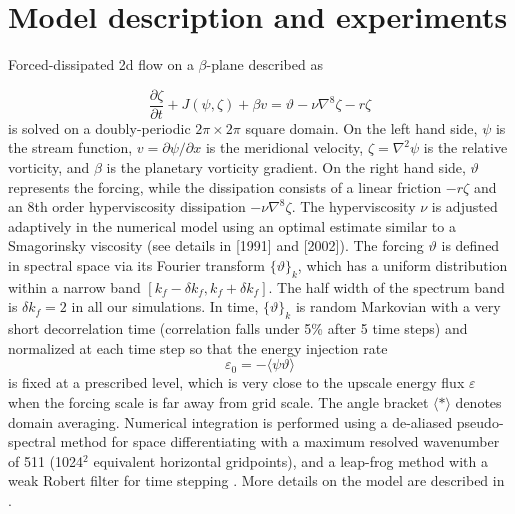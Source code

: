 \documentclass{ametsoc}
\begin{document}
\section{Model description and experiments}

Forced-dissipated 2d flow on a $\beta$-plane described as

\begin{equation}
\frac{\partial\zeta}{\partial t}+J(\psi,\zeta)+\beta v=\vartheta-\nu\nabla^{8}\zeta-r\zeta\label{eq:barotropic_vorticity_eq}
\end{equation}
is solved on a doubly-periodic $2\pi\times2\pi$ square domain. On
the left hand side, $\psi$ is the stream function, $v=\partial\psi/\partial x$
is the meridional velocity, $\zeta=\nabla^{2}\psi$ is the relative vorticity,
and $\beta$ is the planetary vorticity gradient. On the right hand
side, $\vartheta$ represents the forcing, while the dissipation consists
of a linear friction $-r\zeta$ and an 8th order hyperviscosity dissipation
$-\nu\nabla^{8}\zeta$. The hyperviscosity $\nu$ is adjusted adaptively
in the numerical model using an optimal estimate similar to a 
Smagorinsky viscosity (see details in \citeauthor{Maltrud1991}
{[}1991{]} and \citeauthor{Smith2002} {[}2002{]}). 
The forcing $\vartheta$ is defined
in spectral space via its Fourier transform $\{\vartheta\}_{k}$,
which has a uniform distribution within a narrow band $[k_{f}-\delta k_{f},k_{f}+\delta k_{f}]$.
The half width of the spectrum band is $\delta k_{f}=2$ in all our
simulations. In time, $\{\vartheta\}_{k}$ is random Markovian with
a very short decorrelation time (correlation falls under 5\% after
5 time steps) and normalized at each time step so that the energy
injection rate
\begin{equation}
\varepsilon_{0}=-\langle\psi\vartheta\rangle\label{eq:energy_injection_rate}
\end{equation}
is fixed at a prescribed level, which is very close to the upscale
energy flux $\varepsilon$ when the forcing scale is far away from grid
scale. The angle bracket $\langle*\rangle$ denotes domain averaging.
Numerical integration is performed using a de-aliased pseudo-spectral
method for space differentiating with a maximum resolved wavenumber
of 511 (1024$^{2}$ equivalent horizontal gridpoints), and a leap-frog
method with a weak Robert filter for time stepping \citep{Patterson1971}.
More details on the model are described in \citet{Smith2002}.
\end{document}
